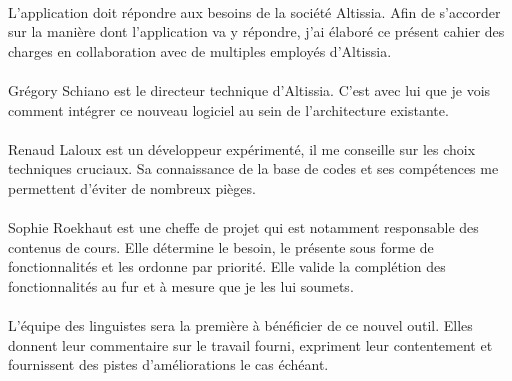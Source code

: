 \paragraph{}
L'application doit répondre aux besoins de la société Altissia.
Afin de s'accorder sur la manière dont l'application va y répondre, j'ai élaboré ce présent cahier des charges en collaboration avec de multiples employés d'Altissia.%

\paragraph{}
Grégory Schiano est le directeur technique d'Altissia.
C'est avec lui que je vois comment intégrer ce nouveau logiciel au sein de l'architecture existante.

\paragraph{}
Renaud Laloux est un développeur expérimenté, il me conseille sur les choix techniques cruciaux. Sa connaissance de la base de codes et ses compétences me permettent d'éviter de nombreux pièges.

\paragraph{}
Sophie Roekhaut est une cheffe de projet qui est notamment responsable des contenus de cours. Elle détermine le besoin, le présente sous forme de fonctionnalités et les ordonne par priorité. Elle valide la complétion des fonctionnalités au fur et à mesure que je les lui soumets.

\paragraph{}
L'équipe des linguistes sera la première à bénéficier de ce nouvel outil. Elles donnent leur commentaire sur le travail fourni, expriment leur contentement et fournissent des pistes d'améliorations le cas échéant.
